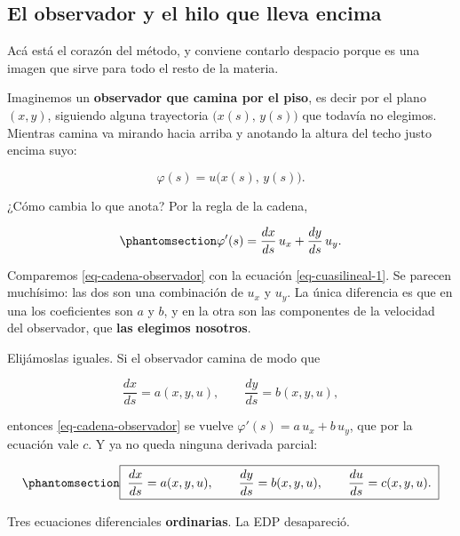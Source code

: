 \documentclass[
  spanish,
  a4paper,
]{scrbook}
\theoremstyle{definition}
\theoremstyle{plain}
\theoremstyle{definition}
\theoremstyle{plain}
\theoremstyle{definition}
\theoremstyle{remark}
\begin{document}
\subsection{El observador y el hilo que lleva
encima}\label{sec-observador}

Acá está el corazón del método, y conviene contarlo despacio porque es
una imagen que sirve para todo el resto de la materia.

Imaginemos un \textbf{observador que camina por el piso}, es decir por
el plano \((x,y)\), siguiendo alguna trayectoria
\(\big(x(s),\, y(s)\big)\) que todavía no elegimos. Mientras camina va
mirando hacia arriba y anotando la altura del techo justo encima suyo:

\[
\varphi(s) = u\big(x(s),\, y(s)\big) .
\]

¿Cómo cambia lo que anota? Por la regla de la cadena,

\begin{equation}\protect\phantomsection\label{eq-cadena-observador}{
\varphi'(s) = \frac{dx}{ds}\,u_x + \frac{dy}{ds}\,u_y .
}\end{equation}

Comparemos \ref{eq-cadena-observador} con la ecuación
\ref{eq-cuasilineal-1}. Se parecen muchísimo: las dos son una
combinación de \(u_x\) y \(u_y\). La única diferencia es que en una los
coeficientes son \(a\) y \(b\), y en la otra son las componentes de la
velocidad del observador, que \textbf{las elegimos nosotros}.

Elijámoslas iguales. Si el observador camina de modo que

\[
\frac{dx}{ds} = a(x,y,u), \qquad \frac{dy}{ds} = b(x,y,u),
\]

entonces \ref{eq-cadena-observador} se vuelve
\(\varphi'(s) = a\,u_x + b\,u_y\), que por la ecuación vale \(c\). Y ya
no queda ninguna derivada parcial:

\begin{equation}\protect\phantomsection\label{eq-sistema-caracteristico}{
\boxed{\;
\frac{dx}{ds} = a(x,y,u), \qquad
\frac{dy}{ds} = b(x,y,u), \qquad
\frac{du}{ds} = c(x,y,u).
\;}
}\end{equation}

Tres ecuaciones diferenciales \textbf{ordinarias}. La EDP desapareció.
\end{document}
